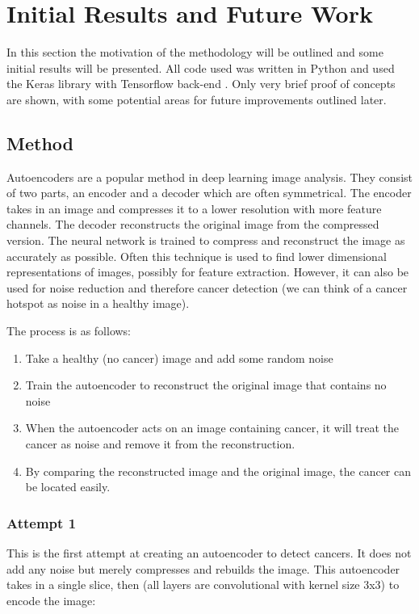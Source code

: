 
\chapter{Initial Results and Future Work}\label{cha:initial_results}
In this section the motivation of the methodology will be outlined and some initial results will be presented.
All code used was written in Python and used the Keras library \cite{chollet2015keras} with Tensorflow back-end \cite{tensorflow2015-whitepaper}.
Only very brief proof of concepts are shown, with some potential areas for future improvements outlined later.

\section{Method}\label{sec:method}
Autoencoders are a popular method in deep learning image analysis.
They consist of two parts, an encoder and a decoder which are often symmetrical.
The encoder takes in an image and compresses it to a lower resolution with more feature channels.
The decoder reconstructs the original image from the compressed version.
The neural network is trained to compress and reconstruct the image as accurately as possible.
Often this technique is used to find lower dimensional representations of images, possibly for feature extraction.
However, it can also be used for noise reduction and therefore cancer detection (we can think of a cancer hotspot as noise in a healthy image).

The process is as follows:

\begin{enumerate}
    \item Take a healthy (no cancer) image and add some random noise
    \item Train the autoencoder to reconstruct the original image that contains no noise
    \item When the autoencoder acts on an image containing cancer, it will treat the cancer as noise and remove it from the reconstruction.
    \item By comparing the reconstructed image and the original image, the cancer can be located easily.
\end{enumerate}

\subsection{Attempt 1}\label{subsec:attempt1}
This is the first attempt at creating an autoencoder to detect cancers.
It does not add any noise but merely compresses and rebuilds the image.
This autoencoder takes in a single slice, then (all layers are convolutional with kernel size 3x3) to encode the image:

